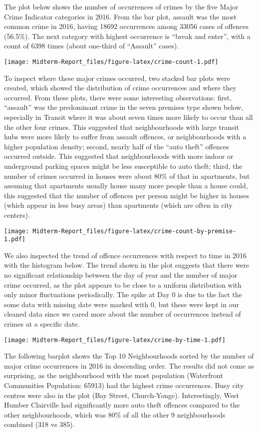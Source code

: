 \documentclass[
]{article}
\begin{document}
The plot below shows the number of occurrences of crimes by the five
Major Crime Indicator categories in 2016. From the bar plot, assault was
the most common crime in 2016, having 18692 occurrences among 33056
cases of offences (56.5\%). The next category with highest occurrence is
``break and enter'', with a count of 6398 times (about one-third of
``Assault'' cases).

\texttt{[image: Midterm-Report\_files/figure-latex/crime-count-1.pdf]}

To inspect where these major crimes occurred, two stacked bar plots were
created, which showed the distribution of crime occurrences and where
they occurred. From these plots, there were some interesting
observations: first, ``assault'' was the predominant crime in the seven
premises type shown below, especially in Transit where it was about
seven times more likely to occur than all the other four crimes. This
suggested that neighbourhoods with large transit hubs were more likely
to suffer from assault offences, or neighbourhoods with a higher
population density; second, nearly half of the ``auto theft'' offences
occurred outside. This suggested that neighbourhoods with more indoor or
underground parking spaces might be less susceptible to auto theft;
third, the number of crimes occurred in houses were about 80\% of that
in apartments, but assuming that apartments usually house many more
people than a house could, this suggested that the number of offences
per person might be higher in houses (which appear in less busy areas)
than apartments (which are often in city centers).

\texttt{[image: Midterm-Report\_files/figure-latex/crime-count-by-premise-1.pdf]}

We also inspected the trend of offence occurrences with respect to time
in 2016 with the histogram below. The trend shown in the plot suggests
that there were no significant relationship between the day of year and
the number of major crime occurred, as the plot appears to be close to a
uniform distribution with only minor fluctuations periodically. The
spike at Day 0 is due to the fact the some data with missing date were
marked with 0, but these were kept in our cleaned data since we cared
more about the number of occurrences instead of crimes at a specific
date.

\texttt{[image: Midterm-Report\_files/figure-latex/crime-by-time-1.pdf]}

The following barplot shows the Top 10 Neighbourhoods sorted by the
number of major crime occurrences in 2016 in descending order. The
results did not come as surprising, as the neighbourhood with the most
population (Waterfront Communities Population: 65913) had the highest
crime occurrences. Busy city centres were also in the plot (Bay Street,
Church-Yonge). Interestingly, West Humber Clairville had significantly
more auto theft offences compared to the other neighbourhoods, which was
80\% of all the other 9 neighbourhoods combined (318 vs 385).
\end{document}
